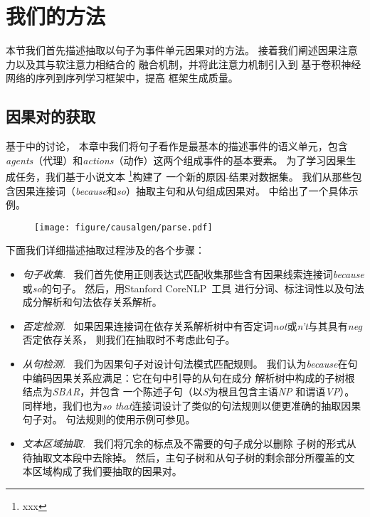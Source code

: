 \section{我们的方法}
\label{sec:causalgen-approach}
本节我们首先描述抽取以句子为事件单元因果对的方法。
接着我们阐述因果注意力以及其与软注意力相结合的
融合机制，并将此注意力机制引入到
基于卷积神经网络的序列到序列学习框架中，提高
框架生成质量。
\subsection{因果对的获取}
\label{sec:causalgen-extraction}
基于中的讨论，
本章中我们将句子看作是最基本的描述事件的语义单元，包含\emph{agents}（代理）和\emph{actions}（动作）这两个组成事件的基本要素。
为了学习因果生成任务，我们基于小说文本
\footnote{xxx}构建了
一个新的原因-结果对数据集。
我们从那些包含因果连接词（\emph{because}和\emph{so}）抽取主句和从句组成因果对。
中给出了一个具体示例。

\begin{figure}[th]
	\centering
	\texttt{[image: figure/causalgen/parse.pdf]}
	\label{fig:causalgen-parse}
\end{figure}

下面我们详细描述抽取过程涉及的各个步骤：
\begin{itemize}
	\item \emph{句子收集.}~\quad
	我们首先使用正则表达式匹配收集那些含有因果线索连接词\emph{because}或\emph{so}的句子。
	然后，用Stanford CoreNLP~\cite{stanfordcorenlp}工具
	进行分词、标注词性以及句法成分解析和句法依存关系解析。
	\item \emph{否定检测.}~\quad 
	如果因果连接词在依存关系解析树中有否定词\emph{not}或\emph{n't}与其具有\emph{neg}否定依存关系，
	则我们在抽取时不考虑此句子。
	\item \emph{从句检测.}~\quad 
	我们为因果句子对设计句法模式匹配规则。
	我们认为\emph{because}在句中编码因果关系应满足：它在句中引导的从句在成分
	解析树中构成的子树根结点为\emph{SBAR}，并包含
	一个陈述子句（以\emph{S}为根且包含主语\emph{NP}
	和谓语\emph{VP}）。
	同样地，我们也为\emph{so that}连接词设计了类似的句法规则以便更准确的抽取因果句子对。
	句法规则的使用示例可参见。	
	\item \emph{文本区域抽取.}~\quad
	我们将冗余的标点及不需要的句子成分以删除
	子树的形式从待抽取文本段中去除掉。
	然后，主句子树和从句子树的剩余部分所覆盖的文本区域构成了我们要抽取的因果对。
\end{itemize}

